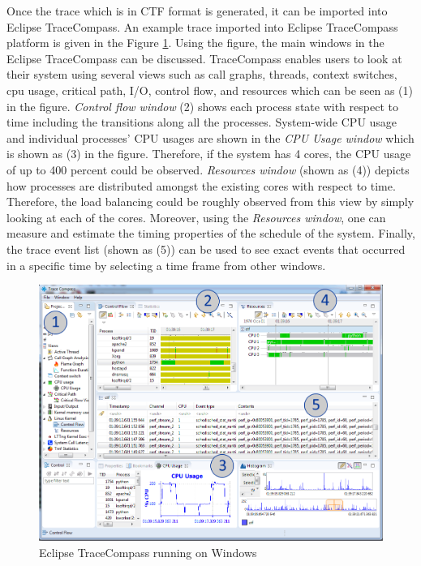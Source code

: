 \begin{itemize}
	Once the trace which is in CTF format is generated, it can be imported into Eclipse TraceCompass. An example trace imported into Eclipse TraceCompass platform is given in the Figure \ref{fig:tracecompass}. Using the figure, the main windows in the Eclipse TraceCompass can be discussed. TraceCompass enables users to look at their system using several views such as call graphs, threads, context switches, cpu usage, critical path, I/O, control flow, and resources which can be seen as (1) in the figure. \textit{Control flow window} (2) shows each process state with respect to time including the transitions along all the processes. System-wide CPU usage and individual processes' CPU usages are shown in the \textit{CPU Usage window} which is shown as (3) in the figure. Therefore, if the system has 4 cores, the CPU usage of up to 400 percent could be observed. \textit{Resources window} (shown as (4)) depicts how processes are distributed amongst the existing cores with respect to time. Therefore, the load balancing could be roughly observed from this view by simply looking at each of the cores. Moreover, using the \textit{Resources window}, one can measure and estimate the timing properties of the schedule of the system. Finally, the trace event list (shown as (5)) can be used to see exact events that occurred in a specific time by selecting a time frame from other windows.
	\begin{figure}[!ht]
		\centering
		\captionsetup{justification=centering}
		\includegraphics[scale=0.45]{content/images/tracecompass.png}
		\caption{Eclipse TraceCompass running on Windows}
		\label{fig:tracecompass}
	\end{figure}


\end{itemize}
